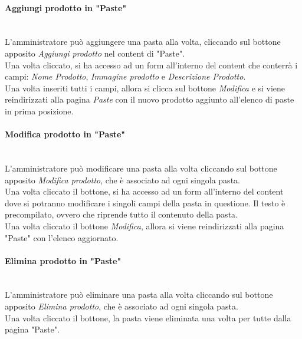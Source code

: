 \paragraph{Aggiungi prodotto in "Paste"}\mbox{}\\
\label{par:AddP}
L'amministratore può aggiungere una pasta alla volta, cliccando sul bottone apposito \emph{Aggiungi prodotto} nel content di "Paste".\\ Una volta cliccato, si ha accesso ad un form all'interno del content che conterrà i campi: \emph{Nome Prodotto}, \emph{Immagine prodotto} e \emph{Descrizione Prodotto}.\\ 
Una volta inseriti tutti i campi, allora si clicca sul bottone \emph{Modifica} e si viene reindirizzati alla pagina \emph{Paste} con il nuovo prodotto aggiunto all'elenco di paste in prima posizione.\\

\paragraph{Modifica prodotto in "Paste"}\mbox{}\\
\label{par:ModP}
L'amministratore può modificare una pasta alla volta cliccando sul bottone apposito \emph{Modifica prodotto}, che è associato ad ogni singola pasta.\\ 
Una volta cliccato il bottone, si ha accesso ad un form all'interno del content dove si potranno modificare i singoli campi della pasta in questione. Il testo è precompilato, ovvero che riprende tutto il contenuto della pasta.\\
Una volta cliccato il bottone \emph{Modifica}, allora si viene reindirizzati alla pagina "Paste" con l'elenco aggiornato.\\

\paragraph{Elimina prodotto in "Paste"}\mbox{}\\
\label{par:DelP}
L'amministratore può eliminare una pasta alla volta cliccando sul bottone apposito \emph{Elimina prodotto}, che è associato ad ogni singola pasta.\\ 
Una volta cliccato il bottone, la pasta viene eliminata una volta per tutte dalla pagina "Paste".\\

